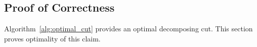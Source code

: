 \documentclass[../main.tex]{subfiles}
\begin{document}
%

\subsection{Proof of Correctness}
\label{sec:proof_of_correctness}

Algorithm~\ref{alg:optimal_cut} provides an optimal decomposing cut. This section proves optimality of this claim.
\end{document}
